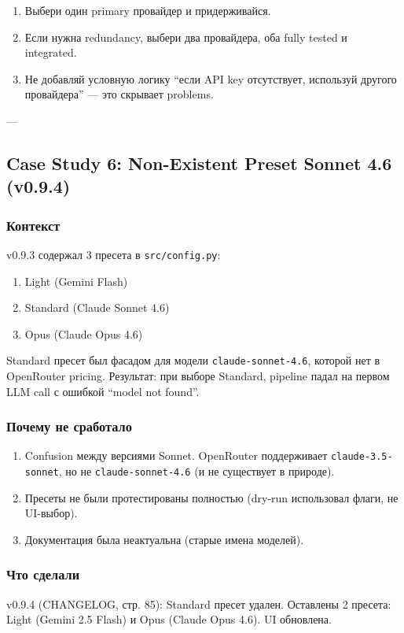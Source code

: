 \begin{enumerate}
\item Выбери один primary провайдер и придерживайся.
\item Если нужна redundancy, выбери два провайдера, оба fully tested и integrated.
\item Не добавляй условную логику ``если API key отсутствует, используй другого провайдера'' --- это скрывает problems.
\end{enumerate}

---

\subsection{Case Study 6: Non-Existent Preset Sonnet 4.6 (v0.9.4)}

\subsubsection*{Контекст}
v0.9.3 содержал 3 пресета в \texttt{src/config.py}:
\begin{enumerate}
\item Light (Gemini Flash)
\item Standard (Claude Sonnet 4.6)
\item Opus (Claude Opus 4.6)
\end{enumerate}

Standard пресет был фасадом для модели \texttt{claude-sonnet-4.6}, которой нет в OpenRouter pricing. Результат: при выборе Standard, pipeline падал на первом LLM call с ошибкой ``model not found''.

\subsubsection*{Почему не сработало}
\begin{enumerate}
\item Confusion между версиями Sonnet. OpenRouter поддерживает \texttt{claude-3.5-sonnet}, но не \texttt{claude-sonnet-4.6} (и не существует в природе).
\item Пресеты не были протестированы полностью (dry-run использовал флаги, не UI-выбор).
\item Документация была неактуальна (старые имена моделей).
\end{enumerate}

\subsubsection*{Что сделали}
v0.9.4 (CHANGELOG, стр. 85): Standard пресет удален. Оставлены 2 пресета: Light (Gemini 2.5 Flash) и Opus (Claude Opus 4.6). UI обновлена.

